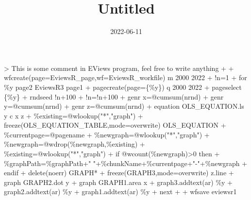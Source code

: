 \documentclass[
]{article}
\title{Untitled}
\author{}
\date{\vspace{-2.5em}2022-06-11}
\newenvironment{Shaded}{\begin{snugshade}}{\end{snugshade}}
\newcommand{\NormalTok}[1]{#1}
\begin{document}
\maketitle

{
\setcounter{tocdepth}{2}
\tableofcontents
}
\begin{Shaded}
\begin{Highlighting}[]
\NormalTok{\textgreater{} \textquotesingle{}This is some comment in EViews program, feel free to write anything}
\NormalTok{+ }
\NormalTok{+ wfcreate(page=EviewsR\_page,wf=EviewsR\_workfile) m 2000 2022}
\NormalTok{+ !n=1}
\NormalTok{+ for \%y  page2 EviewsR3 page1 }
\NormalTok{+ pagecreate(page=\{\%y\}) q 2000 2022}
\NormalTok{+ pageselect \{\%y\}}
\NormalTok{+ rndseed !n+100}
\NormalTok{+ !n=!n+100}
\NormalTok{+ genr x=@cumsum(nrnd)}
\NormalTok{+ genr y=@cumsum(nrnd)}
\NormalTok{+ genr z=@cumsum(nrnd)}
\NormalTok{+ equation OLS\_EQUATION.ls y c x z}
\NormalTok{+ \%existing=@wlookup("*","graph")}
\NormalTok{+ freeze(OLS\_EQUATION\_TABLE,mode=overwrite) OLS\_EQUATION}
\NormalTok{+ \%currentpage=@pagename}
\NormalTok{+   \%newgraph=@wlookup("*","graph")}
\NormalTok{+   \%newgraph=@wdrop(\%newgraph,\%existing)}
\NormalTok{+   \%existing=@wlookup("*","graph")}
\NormalTok{+   if @wcount(\%newgraph)\textgreater{}0 then}
\NormalTok{+   \%graphPath=\%graphPath+" "+\%chunkName+\%currentpage+"{-}"+\%newgraph}
\NormalTok{+   endif}
\NormalTok{+ delete(noerr) GRAPH*}
\NormalTok{+ freeze(GRAPH3,mode=overwrite) z.line}
\NormalTok{+ graph GRAPH2.dot y}
\NormalTok{+ graph GRAPH1.area x}
\NormalTok{+ graph3.addtext(ar) \%y}
\NormalTok{+ graph2.addtext(ar) \%y}
\NormalTok{+ graph1.addtext(ar) \%y}
\NormalTok{+ next}
\NormalTok{+ }
\NormalTok{+ wfsave eviewsr1}
\end{Highlighting}
\end{Shaded}
\end{document}
